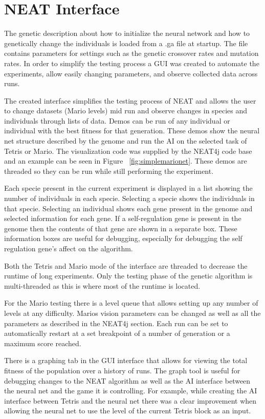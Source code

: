 \documentclass[12pt]{ucthesis} \newif\ifpdf \ifx\pdfoutput\undefined
\begin{document}
\section{NEAT Interface}

The genetic description about how to initialize the neural network and how to
genetically change the individuals is loaded from a .ga file at startup. The
file contains parameters for settings such as the genetic crossover rates and
mutation rates. In order to simplify the testing process a GUI was created to
automate the experiments, allow easily changing parameters, and observe
collected data across runs.

The created interface simplifies the testing process of NEAT and allows the user
to change datasets (Mario levels) mid run and observe changes in species and
individuals through lists of data. Demos can be run of any individual or
individual with the best fitness for that generation. These demos show the
neural net structure described by the genome and run the AI on the selected task of
Tetris or Mario. The visualization code was supplied by the NEAT4j code base
and an example can be seen in Figure ~\ref{fig:simplemarionet}.
These demos are threaded so they can be run while still performing the
experiment.

Each specie present in the current experiment is displayed in a list showing the
number of individuals in each specie. Selecting a specie shows the
individuals in that specie.
Selecting an individual shows each gene present in the genome and selected
information for each gene. If a self-regulation gene is present in the genome
then the contents of that gene are shown in a separate box. These information
boxes are useful for debugging, especially for debugging the self regulation
gene's affect on the algorithm.

Both the Tetris and Mario mode of the interface are threaded to decrease the
runtime of long experiments. Only the testing phase of the genetic algorithm is
multi-threaded as this is where most of the runtime is located.

For the Mario testing there is a level queue that allows setting up any number
of levels at any difficulty.  Marios vision parameters can be changed as well as
all the parameters as described in the NEAT4j section. Each run can be set to
automatically restart at a set breakpoint of a number of generation or a maximum
score reached.

There is a graphing tab in the GUI interface that allows for viewing the total
fitness of the population over a history of runs. The graph tool is useful for
debugging changes to the NEAT algorithm as well as the AI interface between the
neural net and the game it is controlling. For example, while creating the AI
interface between Tetris and the neural net there was a clear improvement when
allowing the neural net to use the level of the current Tetris block as an
input. 
\end{document}
